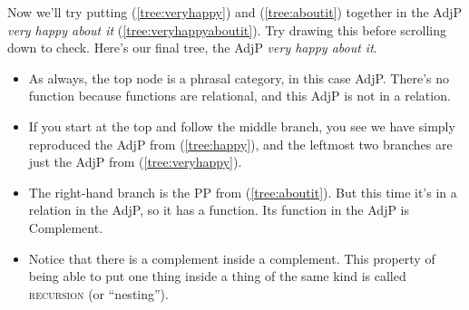 \ea {}\label{tree:aboutit}
\z

Now we'll try putting (\ref{tree:veryhappy}) and (\ref{tree:aboutit}) together in the AdjP \textit{very happy about it} (\ref{tree:veryhappyaboutit}). Try drawing this before scrolling down to check. Here's our final tree, the AdjP \textit{very happy about it}.
\begin{itemize}[noitemsep]
    \item As always, the top node is a phrasal category, in this case AdjP. There's no function because functions are relational, and this AdjP is not in a relation.
    \item If you start at the top and follow the middle branch, you see we have simply reproduced the AdjP from (\ref{tree:happy}), and the leftmost two branches are just the AdjP from (\ref{tree:veryhappy}).
    \item The right-hand branch is the PP from (\ref{tree:aboutit}). But this time it's in a relation in the AdjP, so it has a function. Its function in the AdjP is Complement.
    \item Notice that there is a complement inside a complement. This property of being able to put one thing inside a thing of the same kind is called \textsc{recursion} (or ``nesting'').
\end{itemize}

